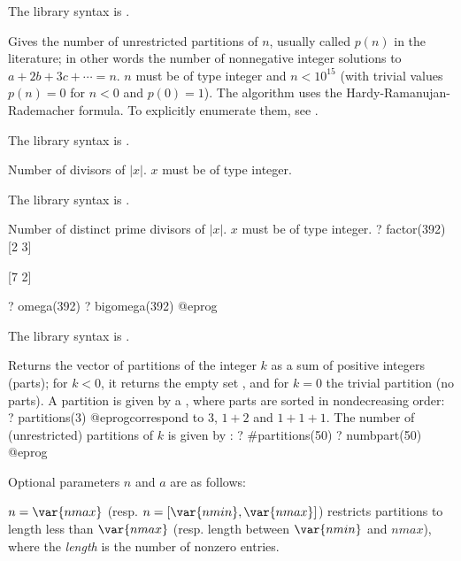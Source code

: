 The library syntax is .

\label{se:numbpart}
Gives the number of unrestricted partitions of
$n$, usually called $p(n)$ in the literature; in other words the number of
nonnegative integer solutions to $a+2b+3c+\cdots=n$. $n$ must be of type
integer and $n<10^{15}$ (with trivial values $p(n) = 0$ for $n < 0$ and
$p(0) = 1$). The algorithm uses the Hardy-Ramanujan-Rademacher formula.
To explicitly enumerate them, see .

The library syntax is .

\label{se:numdiv}
Number of divisors of $|x|$. $x$ must be of type integer.

The library syntax is .

\label{se:omega}
Number of distinct prime divisors of $|x|$. $x$ must be of type integer.
\bprog
? factor(392)
[2 3]

[7 2]

? omega(392)
? bigomega(392)
@eprog

The library syntax is .

\label{se:partitions}
Returns the vector of partitions of the integer $k$ as a sum of positive
integers (parts); for $k < 0$, it returns the empty set \kbd{[]}, and for $k
= 0$ the trivial partition (no parts). A partition is given by a
, where parts are sorted in nondecreasing order:
\bprog
? partitions(3)
@eprog\noindent correspond to $3$, $1+2$ and $1+1+1$. The number
of (unrestricted) partitions of $k$ is given
by :
\bprog
? #partitions(50)
? numbpart(50)
@eprog

\noindent Optional parameters $n$ and $a$ are as follows:

\item $n=\var{nmax}$ (resp. $n=[\var{nmin},\var{nmax}]$) restricts
partitions to length less than $\var{nmax}$ (resp. length between
$\var{nmin}$ and $nmax$), where the \emph{length} is the number of nonzero
entries.

